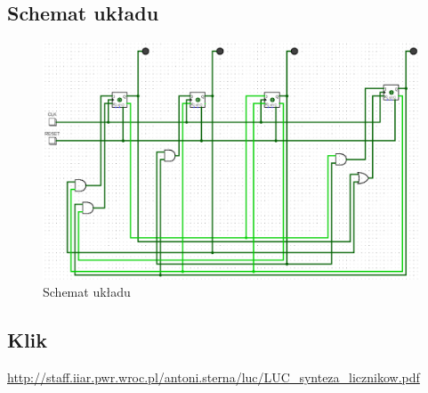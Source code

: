 \newpage

\subsection{Schemat układu}

\begin{figure}[h!]
    \centering
    \includegraphics[width = 12cm]{images/sync/sync_l.png}
    \caption{Schemat układu}
    \label{fig:my_label}
\end{figure}

\subsection{Klik}

\url{http://staff.iiar.pwr.wroc.pl/antoni.sterna/luc/LUC_synteza_licznikow.pdf}
